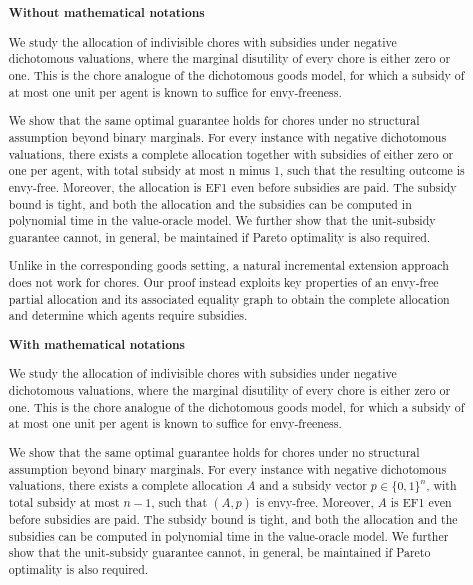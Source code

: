 \documentclass[11pt]{article}
\theoremstyle{plain}
\theoremstyle{plain}
\begin{document}
\makeatletter
\renewcommand\@makefnmark{\hbox{\@textsuperscript{\normalfont\@thefnmark}}}
\makeatother
\renewcommand{\thefootnote}{\fnsymbol{footnote}}



\title{\textsc{}}

\author[]{}
\affil[]{}

\date{}


\begin{abstract}
\noindent \textbf{Without mathematical notations}

We study the allocation of indivisible chores with subsidies under negative dichotomous valuations, where the marginal disutility of every chore is either zero or one. This is the chore analogue of the dichotomous goods model, for which a subsidy of at most one unit per agent is known to suffice for envy-freeness.

We show that the same optimal guarantee holds for chores under no structural assumption beyond binary marginals. For every instance with negative dichotomous valuations, there exists a complete allocation together with subsidies of either zero or one per agent, with total subsidy at most n minus 1, such that the resulting outcome is envy-free. Moreover, the allocation is EF1 even before subsidies are paid. The subsidy bound is tight, and both the allocation and the subsidies can be computed in polynomial time in the value-oracle model. We further show that the unit-subsidy guarantee cannot, in general, be maintained if Pareto optimality is also required.

Unlike in the corresponding goods setting, a natural incremental extension approach does not work for chores. Our proof instead exploits key properties of an envy-free partial allocation and its associated equality graph to obtain the complete allocation and determine which agents require subsidies.

\vspace{2mm}
 
\noindent \textbf{With mathematical notations}

We study the allocation of indivisible chores with subsidies under negative dichotomous valuations, where the marginal disutility of every chore is either zero or one. This is the chore analogue of the dichotomous goods model, for which a subsidy of at most one unit per agent is known to suffice for envy-freeness.

We show that the same optimal guarantee holds for chores under no structural assumption beyond binary marginals. For every instance with negative dichotomous valuations, there exists a complete allocation $A$ and a subsidy vector $p\in\{0,1\}^n$, with total subsidy at most $n-1$, such that $(A,p)$ is envy-free. Moreover, $A$ is EF1 even before subsidies are paid. The subsidy bound is tight, and both the allocation and the subsidies can be computed in polynomial time in the value-oracle model. We further show that the unit-subsidy guarantee cannot, in general, be maintained if Pareto optimality is also required.


\end{abstract}
\end{document}
